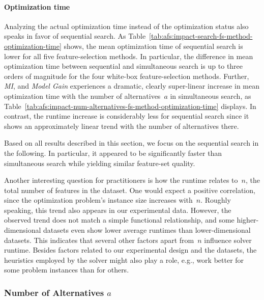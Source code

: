 \documentclass{article}
\theoremstyle{definition}
\begin{document}
\paragraph{Optimization time}

Analyzing the actual optimization time instead of the optimization status also speaks in favor of sequential search.
As Table~\ref{tab:afs:impact-search-fs-method-optimization-time} shows, the mean optimization time of sequential search is lower for all five feature-selection methods.
In particular, the difference in mean optimization time between sequential and simultaneous search is up to three orders of magnitude for the four white-box feature-selection methods.
Further, \emph{MI}, and \emph{Model Gain} experiences a dramatic, clearly super-linear increase in mean optimization time with the number of alternatives~$a$ in simultaneous search, as Table~\ref{tab:afs:impact-num-alternatives-fs-method-optimization-time} displays.
In contrast, the runtime increase is considerably less for sequential search since it shows an approximately linear trend with the number of alternatives there.

Based on all results described in this section, we focus on the sequential search in the following.
In particular, it appeared to be significantly faster than simultaneous search while yielding similar feature-set quality.

Another interesting question for practitioners is how the runtime relates to~$n$, the total number of features in the dataset.
One would expect a positive correlation, since the optimization problem's instance size increases with~$n$.
Roughly speaking, this trend also appears in our experimental data.
However, the observed trend does not match a simple functional relationship, and some higher-dimensional datasets even show lower average runtimes than lower-dimensional datasets.
This indicates that several other factors apart from~$n$ influence solver runtime.
Besides factors related to our experimental design and the datasets, the heuristics employed by the solver might also play a role, e.g., work better for some problem instances than for others.

\subsubsection{Number of Alternatives \texorpdfstring{$a$}{}}
\label{sec:afs:evaluation:search:num-alternatives}
\end{document}

